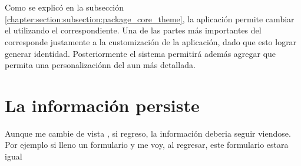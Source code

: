 \section{\themesCPT}

Como se explicó en la subsección \ref{chapter:section:subsection:package_core_theme}, la aplicación permite cambiar el \themeCPT utilizando el \packageAS correspondiente.
Una de las partes más importantes del \frameworkPC \ecommerceCOM corresponde justamente a la customización de la aplicación, dado que esto lograr generar identidad.
Posteriormente el sistema permitirá además agregar \templatesAS que permita una personalizaciónn del \websiteINT aun más detallada.



\section{La información persiste}

Aunque me cambie de vista , si regreso, la información deberia seguir viendose. Por ejemplo si lleno un formulario y me voy, al regresar, este formulario estara igual


%


